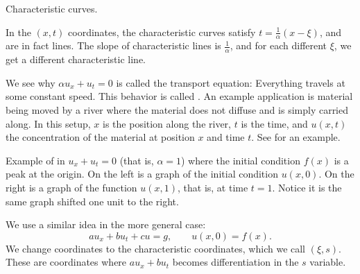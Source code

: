 \begin{example}
\begin{mywrapfig}{2.8in}
\capstart
{}
\caption{Characteristic curves.\label{fopde:charcurves}}
\end{mywrapfig}

In the $(x,t)$ coordinates, the characteristic curves satisfy
$t = \frac{1}{\alpha} ( x- \xi)$, and are in fact lines.
The slope of characteristic lines is
$\frac{1}{\alpha}$, and for each different $\xi$, we get a different
characteristic line.

We see why $\alpha u_x + u_t = 0$ is called the
transport equation: Everything travels at some constant speed.
This behavior is called \emph{}.
An example application is material being moved by a river where the material
does not diffuse and is simply carried along.  In this setup, $x$ is
the position along the river, $t$ is the time, and $u(x,t)$ the
concentration of the
material at position $x$ and time $t$.  See
 for an example.
\begin{myfig}
\capstart
\caption{Example of 
in $u_x+u_t = 0$ (that is, $\alpha = 1$) where the
initial condition $f(x)$ is a peak at the origin.  On the left is a graph
of the initial condition $u(x,0)$.  On the right is a graph of
the function $u(x,1)$, that is, at time $t=1$.  Notice it is the same
graph shifted one unit to
the right.\label{fopde:transportfig}}
\end{myfig}
\end{example}

We use a similar idea in the more general case:
\begin{equation*}
a u_x + b u_t + c u = g, \qquad u(x,0) = f(x)  .
\end{equation*}
We change coordinates to the
characteristic coordinates, which we call $(\xi,s)$.
These are coordinates where $a u_x + b u_t$ becomes differentiation
in the $s$ variable.

